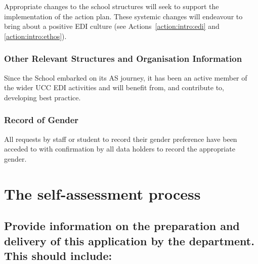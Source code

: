 Appropriate changes to the school structures will seek to support the implementation of the action plan. These systemic changes will endeavour to bring about a positive EDI culture (see Actions~\ref{action:intro:edi} and \ref{action:intro:ethos}).


\subsubsection{Other Relevant Structures and Organisation Information}
Since the School embarked on its AS journey, it has been an active member of the wider UCC EDI activities and will benefit from, and contribute to, developing best practice.


\subsubsection{Record of Gender}
All requests by staff or student to record their gender preference have been acceded to with confirmation by all data holders to record the appropriate gender.  






\section{The self-assessment process}


\subsection{Provide information on the preparation and delivery of this application by the department. This should include:}


